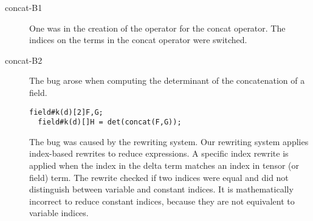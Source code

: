 \begin{description}
\item[concat-B1]
One was in the creation of the \name{}  operator for the concat operator.
The indices on the terms in the concat \name{} operator were switched.
\item[concat-B2]
The bug arose when computing the determinant of the concatenation of a field.
\begin{lstlisting}[mathescape=true]
  field#k(d)[2]F,G;
  field#k(d)[]H = det(concat(F,G));
\end{lstlisting}
The bug was caused by the rewriting system.
Our rewriting system applies index-based rewrites to reduce \name{} expressions. 
A specific index rewrite is applied when the index in the delta term matches an index in tensor (or field)  term.
The rewrite checked if two indices were equal and did not distinguish between variable and constant indices.
It is mathematically incorrect to reduce constant indices, because they are not equivalent to variable indices.
\end{description}